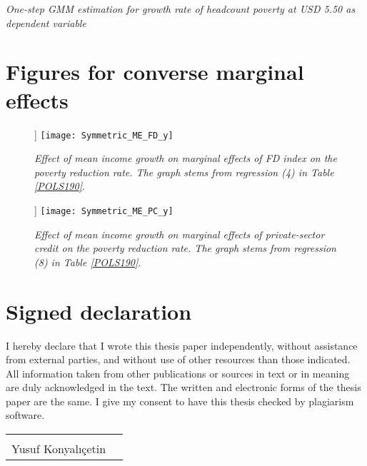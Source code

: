 \documentclass[12pt, a4paper]{article}
\begin{document}
\begin{appendices}
\begin{table}[htbp]
\begin{threeparttable}
\begin{tablenotes}
		\end{tablenotes}
	\end{threeparttable}
	\caption[One-Step System-GMM Estimation Results for Headcount Poverty at USD 5.50]{\textit{One-step GMM estimation for growth rate of headcount poverty at USD 5.50 as dependent variable}}
	\label{1GMM550full}
\end{table}
\newpage
\section{Figures for converse marginal effects} \label{ConversePlots}

\begin{figure}[[htbp]]
	\texttt{[image: Symmetric\_ME\_FD\_y]}
	\centering
	\caption[Marginal Effect of Levels of FD Index on Poverty Reduction at Given Levels of Mean Income Growth]{\textit{Effect of mean income growth on marginal effects of FD index on the poverty reduction rate. The graph stems from regression (4) in Table \ref{POLS190}}.}
	\label{fig5}
\end{figure}

\begin{figure}[[htbp]]
	\texttt{[image: Symmetric\_ME\_PC\_y]}
	\centering
	\caption[Marginal Effect of Levels of Private-sector Credit on Poverty Reduction at Given Levels of Mean Income Growth]{\textit{Effect of mean income growth on marginal effects of private-sector credit on the poverty reduction rate. The graph stems from regression (8) in Table \ref{POLS190}}.}
	\label{fig6}
\end{figure}
\newpage
\end{appendices}





\newpage
{}
\section*{Signed declaration}

I hereby declare that I wrote this thesis paper independently, without assistance from external parties, and without use of other resources than those indicated. All information taken from other publications or sources in text or in meaning are duly acknowledged in the text. The written and electronic forms of the thesis paper are the same. I give my consent to have this thesis checked by plagiarism software.
\newline

\noindent\begin{tabular}{ll}
	\makebox[2.5in]{\hrulefill} \\
	{Yusuf Konyal{\i}\c{c}etin}
\end{tabular}
\end{document}
